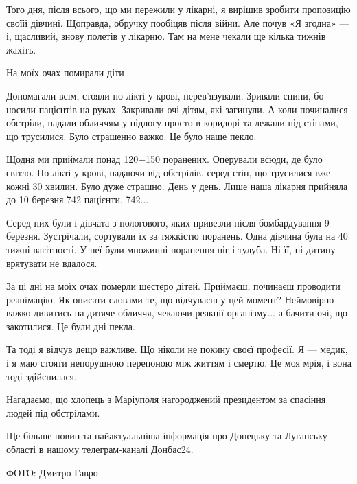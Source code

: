 Того дня, після всього, що ми пережили у лікарні, я вирішив зробити пропозицію своїй дівчині. Щоправда, обручку пообіцяв після війни. Але почув «Я згодна» — і, щасливий, знову полетів у лікарню. Там на мене чекали ще кілька тижнів жахіть.

На моїх очах помирали діти

Допомагали всім, стояли по лікті у крові, перев'язували. Зривали спини, бо носили пацієнтів на руках. Закривали очі дітям, які загинули. А коли починалися обстріли, падали обличчям у підлогу просто в коридорі та лежали під стінами, що трусилися. Було страшенно важко. Це було наше пекло.

Щодня ми приймали понад 120−150 поранених. Оперували всюди, де було світло. По лікті у крові, падаючи від обстрілів, серед стін, що трусилися вже кожні 30 хвилин. Було дуже страшно. День у день. Лише наша лікарня прийняла до 10 березня 742 пацієнти. 742...

Серед них були і дівчата з пологового, яких привезли після бомбардування 9 березня. Зустрічали, сортували їх за тяжкістю поранень. Одна дівчина була на 40 тижні вагітності. У неї були множинні поранення ніг і тулуба. Ні її, ні дитину врятувати не вдалося.

За ці дні на моїх очах померли шестеро дітей. Приймаєш, починаєш проводити реанімацію. Як описати словами те, що відчуваєш у цей момент? Неймовірно важко дивитись на дитяче обличчя, чекаючи реакції організму... а бачити очі, що закотилися. Це були дні пекла.

Та тоді я відчув дещо важливе. Що ніколи не покину своєї професії. Я — медик, і я маю стояти непорушною перепоною між життям і смертю. Це моя мрія, і вона тоді здійснилася.

Нагадаємо, що хлопець з Маріуполя нагороджений президентом за спасіння людей під обстрілами.

Ще більше новин та найактуальніша інформація про Донецьку та Луганську області в нашому телеграм-каналі Донбас24.

ФОТО: Дмитро Гавро

